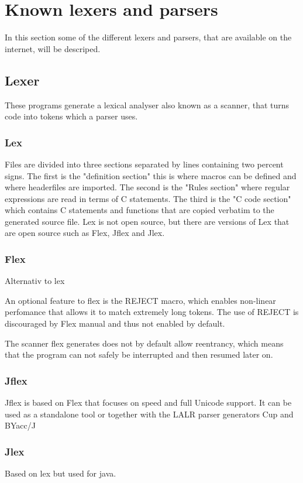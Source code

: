 \section{Known lexers and parsers}
In this section some of the different lexers and parsers, that are available on the internet, will be descriped.

\subsection{Lexer}
These programs generate a lexical analyser also known as a scanner, that turns code into tokens which a parser uses.

\subsubsection{Lex}
Files are divided into three sections separated by lines containing two percent signs. The first is the "definition section" this is where macros can be defined and where headerfiles are imported. The second is the "Rules section" where regular expressions are read in terms of C statements. The third is the "C code section" which contains C statements and functions that are copied verbatim to the generated source file. Lex is not open source, but there are versions of Lex that are open source such as Flex, Jflex and Jlex. \citep{Lex}

\subsubsection{Flex}
Alternativ to lex \citep{Flex}

An optional feature to flex is the REJECT macro, which enables non-linear perfomance that allows it to match extremely long tokens. The use of REJECT is discouraged by Flex manual and thus not enabled by default. 

The scanner flex generates does not by default allow reentrancy, which means that the program can not safely be interrupted and then resumed later on.

\subsubsection{Jflex}
Jflex is based on Flex that focuses on speed and full Unicode support. It can be used as a standalone tool or together with the LALR parser generators Cup and BYacc/J \citep{Jflex}

\subsubsection{Jlex}
Based on lex but used for java. \citep{Jlex}

